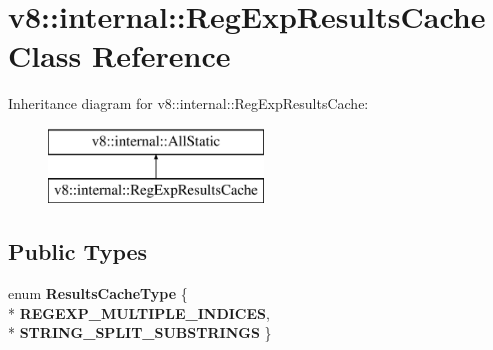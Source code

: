 \hypertarget{classv8_1_1internal_1_1_reg_exp_results_cache}{}\section{v8\+:\+:internal\+:\+:Reg\+Exp\+Results\+Cache Class Reference}
\label{classv8_1_1internal_1_1_reg_exp_results_cache}
Inheritance diagram for v8\+:\+:internal\+:\+:Reg\+Exp\+Results\+Cache\+:\begin{figure}[H]
\begin{center}
\leavevmode
\includegraphics[height=2.000000cm]{classv8_1_1internal_1_1_reg_exp_results_cache}
\end{center}
\end{figure}
\subsection*{Public Types}
\begin{DoxyCompactItemize}
\item 
enum {\bfseries Results\+Cache\+Type} \{ \\*
{\bfseries R\+E\+G\+E\+X\+P\+\_\+\+M\+U\+L\+T\+I\+P\+L\+E\+\_\+\+I\+N\+D\+I\+C\+ES}, 
\\*
{\bfseries S\+T\+R\+I\+N\+G\+\_\+\+S\+P\+L\+I\+T\+\_\+\+S\+U\+B\+S\+T\+R\+I\+N\+GS}
 \}\hypertarget{classv8_1_1internal_1_1_reg_exp_results_cache_a3899f4b7c08be12c8deb57d5fa9dcd01}{}\label{classv8_1_1internal_1_1_reg_exp_results_cache_a3899f4b7c08be12c8deb57d5fa9dcd01}

\end{DoxyCompactItemize}
